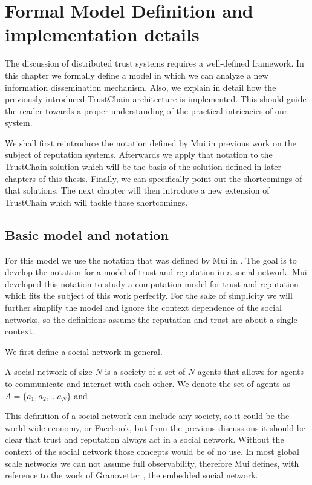 \chapter{Formal Model Definition and implementation details}
\label{chap:model}
The discussion of distributed trust systems requires a well-defined framework. In this chapter we
formally define a model in which we can analyze a new information dissemination mechanism. Also, we
explain in detail how the previously introduced TrustChain architecture is implemented. This should
guide the reader towards a proper understanding of the practical intricacies of our system. 

We shall first reintroduce the
notation defined by Mui in previous work on the subject of reputation systems. Afterwards we
apply that notation to the TrustChain solution which will be the basis of the solution defined
in later chapters of this thesis. Finally, we can specifically point out the shortcomings of that
solutions. The next chapter will then introduce a new extension of TrustChain which will tackle
those shortcomings.


\section{Basic model and notation}
\label{sec:notation}
For this model we use the notation that was defined by Mui in \cite{mui2002computational}. The goal 
is to develop the notation for a model of trust and reputation in a social network. Mui developed 
this notation to study a computation model for trust and reputation which fits the subject of this 
work perfectly. For the sake of simplicity we will further simplify the model and ignore the context
dependence of the social networks, so the definitions assume the reputation and trust are about a
single context.

We first define a social network in general.

\begin{defn}
    A social network of size $N$ is a society of a set of $N$ agents that allows for agents to communicate and
    interact with each other. We denote the set of agents as $A = \{a_1, a_2, ... a_N\}$ and 
\end{defn}

This definition of a social network can include any society, so it could be the world wide economy,
or Facebook, but from the previous discussions it should be clear that trust and reputation always 
act in a social network. Without the context of the social network those concepts would be of no
use. In most global scale networks we can not assume full observability, therefore Mui defines, with
reference to the work of Granovetter \cite{granovetter1985economic}, the embedded social network.


